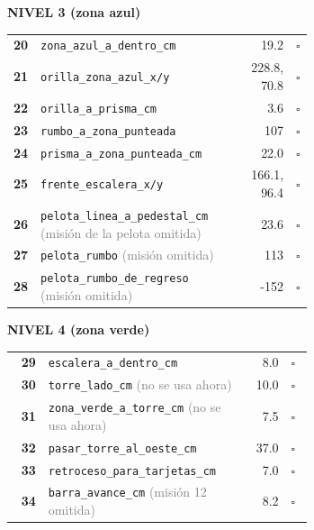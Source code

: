\documentclass[9pt]{extarticle}
\begin{document}
\begin{minipage}[t]{0.245\linewidth}\tiny
{\small\bfseries\color{blue!75!black} NIVEL 3 (zona azul)}\par
\begin{tabular}{@{}r@{\,}>{\raggedright\arraybackslash}p{0.66\linewidth}r@{\,}l@{}}
\textbf{20} & \texttt{zona\_\allowbreak{}azul\_\allowbreak{}a\_\allowbreak{}dentro\_\allowbreak{}cm} & 19.2 & $\square$ \\
\textbf{21} & \texttt{orilla\_\allowbreak{}zona\_\allowbreak{}azul\_\allowbreak{}x/y} & 228.8, 70.8 & $\square$ \\
\textbf{22} & \texttt{orilla\_\allowbreak{}a\_\allowbreak{}prisma\_\allowbreak{}cm} & 3.6 & $\square$ \\
\textbf{23} & \texttt{rumbo\_\allowbreak{}a\_\allowbreak{}zona\_\allowbreak{}punteada} & 107 & $\square$ \\
\textbf{24} & \texttt{prisma\_\allowbreak{}a\_\allowbreak{}zona\_\allowbreak{}punteada\_\allowbreak{}cm} & 22.0 & $\square$ \\
\textbf{25} & \texttt{frente\_\allowbreak{}escalera\_\allowbreak{}x/y} & 166.1, 96.4 & $\square$ \\
\textbf{26} & \texttt{pelota\_\allowbreak{}linea\_\allowbreak{}a\_\allowbreak{}pedestal\_\allowbreak{}cm} \textcolor{gray}{(misión de la pelota omitida)} & 23.6 & $\square$ \\
\textbf{27} & \texttt{pelota\_\allowbreak{}rumbo} \textcolor{gray}{(misión omitida)} & 113 & $\square$ \\
\textbf{28} & \texttt{pelota\_\allowbreak{}rumbo\_\allowbreak{}de\_\allowbreak{}regreso} \textcolor{gray}{(misión omitida)} & -152 & $\square$ \\
\end{tabular}\end{minipage}\hfill
\begin{minipage}[t]{0.245\linewidth}\tiny
{\small\bfseries\color{green!50!black} NIVEL 4 (zona verde)}\par
\begin{tabular}{@{}r@{\,}>{\raggedright\arraybackslash}p{0.66\linewidth}r@{\,}l@{}}
\textbf{29} & \texttt{escalera\_\allowbreak{}a\_\allowbreak{}dentro\_\allowbreak{}cm} & 8.0 & $\square$ \\
\textbf{30} & \texttt{torre\_\allowbreak{}lado\_\allowbreak{}cm} \textcolor{gray}{(no se usa ahora)} & 10.0 & $\square$ \\
\textbf{31} & \texttt{zona\_\allowbreak{}verde\_\allowbreak{}a\_\allowbreak{}torre\_\allowbreak{}cm} \textcolor{gray}{(no se usa ahora)} & 7.5 & $\square$ \\
\textbf{32} & \texttt{pasar\_\allowbreak{}torre\_\allowbreak{}al\_\allowbreak{}oeste\_\allowbreak{}cm} & 37.0 & $\square$ \\
\textbf{33} & \texttt{retroceso\_\allowbreak{}para\_\allowbreak{}tarjetas\_\allowbreak{}cm} & 7.0 & $\square$ \\
\textbf{34} & \texttt{barra\_\allowbreak{}avance\_\allowbreak{}cm} \textcolor{gray}{(misión 12 omitida)} & 8.2 & $\square$ \\
\end{tabular}\end{minipage}\hfill
\end{document}
